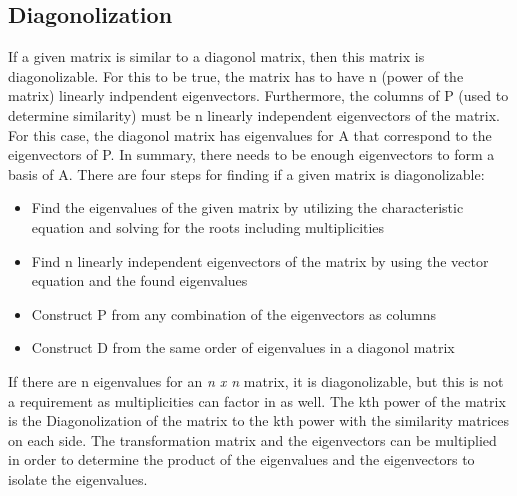 \documentclass[12pt]{article}
\begin{document}
\subsection{Diagonolization}
If a given matrix is similar to a diagonol matrix, then this matrix is diagonolizable. For this to be true, the matrix has to have n (power of the matrix) linearly indpendent eigenvectors. 
Furthermore, the columns of P (used to determine similarity) must be n linearly independent eigenvectors of the matrix. For this case, the diagonol matrix has eigenvalues for A that 
correspond to the eigenvectors of P. In summary, there needs to be enough eigenvectors to form a basis of A. 
There are four steps for finding if a given matrix is diagonolizable:
\begin{itemize}
    \item Find the eigenvalues of the given matrix by utilizing the characteristic equation and solving for the roots including multiplicities
    \item Find n linearly independent eigenvectors of the matrix by using the vector equation and the found eigenvalues
    \item Construct P from any combination of the eigenvectors as columns
    \item Construct D from the same order of eigenvalues in a diagonol matrix
\end{itemize}
If there are n eigenvalues for an \textit{n x n} matrix, it is diagonolizable, but this is not a requirement as multiplicities can factor in as well. The kth power of the matrix is the 
Diagonolization of the matrix to the kth power with the similarity matrices on each side. The transformation matrix and the eigenvectors can be multiplied in order to determine the 
product of the eigenvalues and the eigenvectors to isolate the eigenvalues. 
\end{document}
